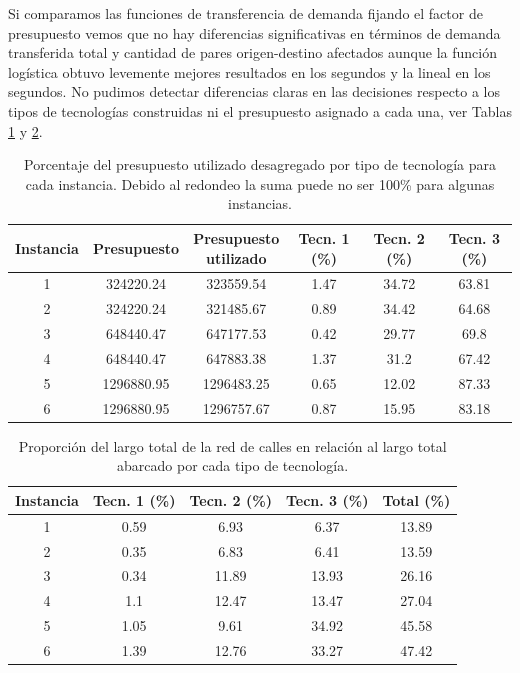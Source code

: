 Si comparamos las funciones de transferencia de demanda fijando el factor de presupuesto vemos que no hay diferencias significativas en términos de demanda transferida total y cantidad de pares origen-destino afectados aunque la función logística obtuvo levemente mejores resultados en los segundos y la lineal en los segundos. No pudimos detectar diferencias claras en las decisiones respecto a los tipos de tecnologías construidas ni el presupuesto asignado a cada una, ver Tablas \ref{table:montevideobudgetusage} y \ref{table:montevideoinfracoverage}.

\begin{table}[h!]
  \centering
  \begin{adjustbox}{width=1.2\textwidth,center=\textwidth}
    \begin{tabular}{cccccc}
      \toprule
        Instancia & Presupuesto & \shortstack{Presupuesto \\ utilizado} & Tecn. 1 (\%) & Tecn. 2 (\%) & Tecn. 3 (\%) \\
      \midrule
        1 & 324220.24 & 323559.54 & 1.47 & 34.72 & 63.81 \\
        2 & 324220.24 & 321485.67 & 0.89 & 34.42 & 64.68 \\
        3 & 648440.47 & 647177.53 & 0.42 & 29.77 & 69.8 \\
        4 & 648440.47 & 647883.38 & 1.37 & 31.2 & 67.42 \\
        5 & 1296880.95 & 1296483.25 & 0.65 & 12.02 & 87.33 \\
        6 & 1296880.95 & 1296757.67 & 0.87 & 15.95 & 83.18 \\
      \bottomrule
    \end{tabular}
  \end{adjustbox}
  \caption{Porcentaje del presupuesto utilizado desagregado por tipo de tecnología para cada instancia. Debido al redondeo la suma puede no ser 100\% para algunas instancias.}\label{table:montevideobudgetusage}
\end{table}

\begin{table}[h!]
  \centering
  \begin{tabular}{ccccc}
    \toprule
      Instancia & Tecn. 1 (\%) & Tecn. 2 (\%) & Tecn. 3 (\%) & Total (\%) \\
    \midrule
      1 & 0.59 & 6.93 & 6.37 & 13.89 \\
      2 & 0.35 & 6.83 & 6.41 & 13.59 \\
      3 & 0.34 & 11.89 & 13.93 & 26.16 \\
      4 & 1.1 & 12.47 & 13.47 & 27.04 \\
      5 & 1.05 & 9.61 & 34.92 & 45.58 \\
      6 & 1.39 & 12.76 & 33.27 & 47.42 \\
    \bottomrule
  \end{tabular}
  \caption{Proporción del largo total de la red de calles en relación al largo total abarcado por cada tipo de tecnología.}
  \label{table:montevideoinfracoverage}
\end{table}

